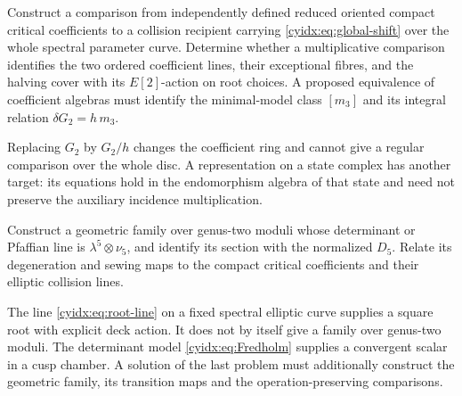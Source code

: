 \begin{problem}\label{cyidx:prob:compact}
Construct a comparison from independently defined
reduced oriented compact critical coefficients to
a collision recipient carrying
\eqref{cyidx:eq:global-shift} over the whole spectral
parameter curve. Determine whether a multiplicative
comparison identifies the two ordered coefficient
lines, their exceptional fibres, and the halving
cover with its \(E[2]\)-action on root choices.
A proposed equivalence of coefficient algebras must
identify the minimal-model class \([m_3]\) and its
integral relation \(\delta G_2=h\,m_3\).
\end{problem}

Replacing \(G_2\) by \(G_2/h\) changes the coefficient
ring and cannot give a regular comparison over the
whole disc. A representation on a state complex has
another target: its equations hold in the endomorphism
algebra of that state and need not preserve the
auxiliary incidence multiplication.

\begin{problem}\label{cyidx:prob:weight-five}
Construct a geometric family over genus-two moduli
whose determinant or Pfaffian line is
\(\lambda^5\otimes\nu_5\), and identify its section
with the normalized \(D_5\). Relate its degeneration
and sewing maps to the compact critical coefficients
and their elliptic collision lines.
\end{problem}

The line \eqref{cyidx:eq:root-line} on a fixed spectral
elliptic curve supplies a square root with explicit
deck action. It does not by itself give a family over
genus-two moduli. The determinant model
\eqref{cyidx:eq:Fredholm} supplies a convergent scalar
in a cusp chamber. A solution of the last problem
must additionally construct the geometric family,
its transition maps and the operation-preserving
comparisons.
